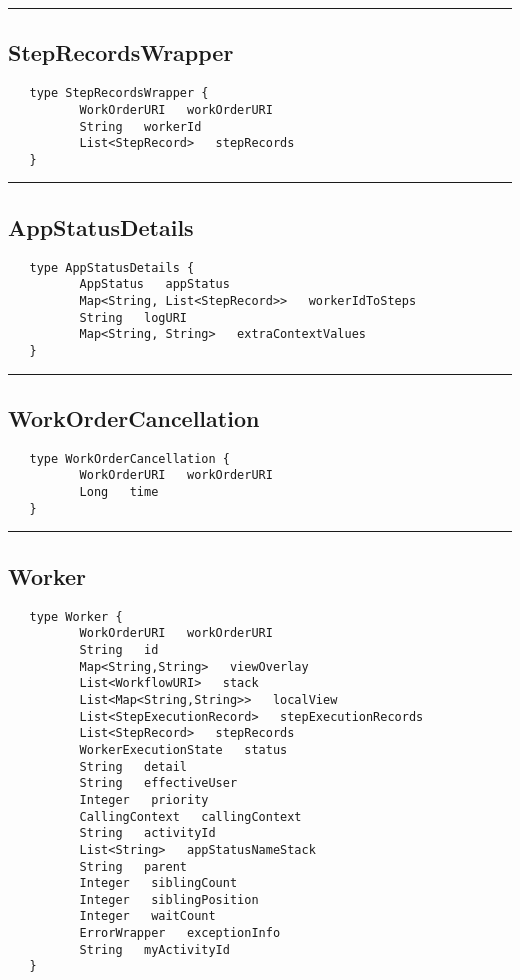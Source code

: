 \rule{15cm}{2pt}
\subsection{StepRecordsWrapper}
\label{type:StepRecordsWrapper}

\begin{verbatim}
   type StepRecordsWrapper {
          WorkOrderURI   workOrderURI
          String   workerId
          List<StepRecord>   stepRecords
   }
\end{verbatim}

\rule{15cm}{2pt}
\subsection{AppStatusDetails}
\label{type:AppStatusDetails}

\begin{verbatim}
   type AppStatusDetails {
          AppStatus   appStatus
          Map<String, List<StepRecord>>   workerIdToSteps
          String   logURI
          Map<String, String>   extraContextValues
   }
\end{verbatim}

\rule{15cm}{2pt}
\subsection{WorkOrderCancellation}
\label{type:WorkOrderCancellation}

\begin{verbatim}
   type WorkOrderCancellation {
          WorkOrderURI   workOrderURI
          Long   time
   }
\end{verbatim}

\rule{15cm}{2pt}
\subsection{Worker}
\label{type:Worker}

\begin{verbatim}
   type Worker {
          WorkOrderURI   workOrderURI
          String   id
          Map<String,String>   viewOverlay
          List<WorkflowURI>   stack
          List<Map<String,String>>   localView
          List<StepExecutionRecord>   stepExecutionRecords
          List<StepRecord>   stepRecords
          WorkerExecutionState   status
          String   detail
          String   effectiveUser
          Integer   priority
          CallingContext   callingContext
          String   activityId
          List<String>   appStatusNameStack
          String   parent
          Integer   siblingCount
          Integer   siblingPosition
          Integer   waitCount
          ErrorWrapper   exceptionInfo
          String   myActivityId
   }
\end{verbatim}

